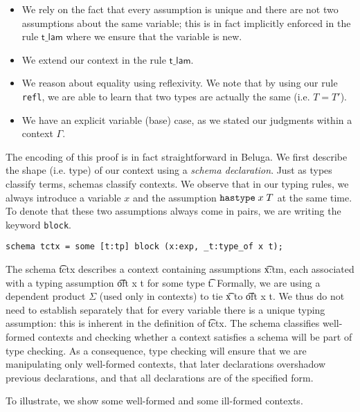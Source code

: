 \begin{itemize}
\item We rely on the fact that every assumption is unique and there
  are not two assumptions about the same variable; this is in fact
  implicitly enforced in the rule $\textsf{t\_lam}$ where we ensure
  that the variable is new.
\item We extend our context in the rule $\textsf{t\_lam}$.
\item We reason about equality using reflexivity. We note that by
  using our rule \lstinline!refl!, we are able to learn that two types
  are actually the same (i.e. $T = T'$).
\item We have an explicit variable (base) case, as we stated our judgments
  within a context $\Gamma$.
\end{itemize}


The encoding of this proof is in fact straightforward in Beluga. We
first describe the shape (i.e. type) of our context using a
\emph{schema declaration}. Just as types classify terms, schemas
classify contexts. We observe that in our typing rules, we always
introduce a variable $x$ and the assumption $\mathtt{hastype}\; x\;T$ at the same
time.
To denote that these two assumptions always come in pairs, we are
writing the keyword \lstinline!block!.

\begin{lstlisting}
schema tctx = some [t:tp] block (x:exp, _t:type_of x t);
\end{lstlisting}

The schema \t{tctx} describes a context containing assumptions
\t{x:tm}, each associated with a typing assumption \t{oft x t}
for some type \t{t}.  Formally, we are using a dependent product $\Sigma$
(used only in contexts) to tie \t{x} to \t{oft x t}.
We thus do not need to establish separately that for every variable there is a
unique typing assumption: this is inherent in the definition of \t{tctx}.
The schema classifies well-formed contexts and checking whether a
context satisfies a schema will be part of type checking. As a
consequence, type checking will ensure that we are manipulating only
well-formed contexts, that later declarations overshadow previous
declarations, and that all declarations are of the specified form.

To illustrate, we show some well-formed  and some ill-formed
contexts.

